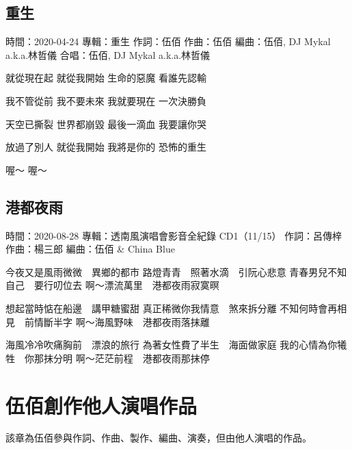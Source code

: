 \documentclass[UTF8,a4paper,oneside,twocolumn,12pt]{ctexbook}
\newcommand{\infopair}[2]{\textbullet #1：#2}
\newcommand{\zc}[1][伍佰]{\infopair{作詞}{#1}}
\newcommand{\zq}[1][伍佰]{\infopair{作曲}{#1}}
\newcommand{\bq}[1][伍佰]{\infopair{編曲}{#1}}
\newcommand{\zj}[1]{\infopair{專輯}{#1}}
\newcommand{\sj}[1]{\infopair{時間}{#1}}
\newenvironment{info}{\begin{flushleft}\kaishu
	}
	{\end{flushleft}\normalsize\yahei\par}
\newenvironment{lyric}{
	}
{}
\begin{document}
\section{重生}
\begin{info}
	\sj{2020-04-24}
	\zj{重生}
	\zc
	\zq
	\bq[伍佰, DJ Mykal a.k.a.林哲儀]
	\infopair{合唱}{伍佰, DJ Mykal a.k.a.林哲儀}
\end{info}
\begin{lyric}
	就從現在起 就從我開始
	生命的惡魔 看誰先認輸

	我不管從前 我不要未來
	我就要現在 一次決勝負

	天空已撕裂 世界都崩毀
	最後一滴血 我要讓你哭

	放過了別人 就從我開始
	我將是你的 恐怖的重生

	喔～
	喔～
\end{lyric}

\section{港都夜雨}
\begin{info}
	\sj{2020-08-28}
	\zj{透南風演唱會影音全紀錄 CD1（11/15）}
	\zc[呂傳梓]
	\zq[楊三郎]
	\bq[伍佰 \& China Blue]
\end{info}
\begin{lyric}
	今夜又是風雨微微　異鄉的都市
	路燈青青　照著水滴　引阮心悲意
	青春男兒不知自己　要行叨位去
	啊～漂流萬里　港都夜雨寂寞暝

	想起當時惦在船邊　講甲糖蜜甜
	真正稀微你我情意　煞來拆分離
	不知何時會再相見　前情斷半字
	啊～海風野味　港都夜雨落抹離

	海風冷冷吹痛胸前　漂浪的旅行
	為著女性費了半生　海面做家庭
	我的心情為你犧牲　你那抹分明
	啊～茫茫前程　港都夜雨那抹停
\end{lyric}

\chapter{伍佰創作他人演唱作品}
該章為伍佰參與作詞、作曲、製作、編曲、演奏，但由他人演唱的作品。
\end{document}
